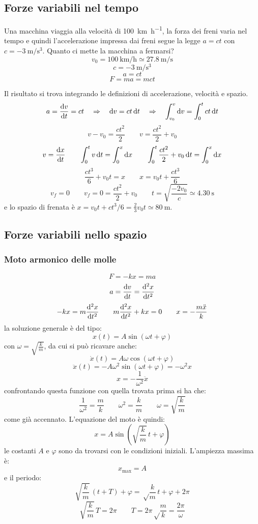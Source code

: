 \subsection{Forze variabili nel tempo}
\begin{Es}
  Una macchina viaggia alla velocità di \SI{100}{\kilo\meter\per\hour}, la forza dei freni
  varia nel tempo e quindi l'accelerazione impressa dai freni segue
  la legge $a=ct$ con $c=\SI{-3}{\meter\per\second^3}$. Quanto ci mette la
  macchina a fermarsi?
  \[ v_0=\SI{100}{\kilo\meter\per\hour} \simeq \SI{27.8}{\meter\per\second} \]
  \[ c=\SI{-3}{\meter\per\second^3} \]
  \[ a=ct \]
  \[ F=ma=mct \]

  Il risultato si trova integrando le definizioni di accelerazione, velocità e spazio.
  \[a=\frac{\mathrm{d} v}{\mathrm{d} t}=ct \quad \Rightarrow \quad\mathrm{d} v=ct\,\mathrm{d}
    t\quad\Rightarrow\quad\int_{v_0}^v\mathrm{d} v=\int_0^t ct\,\mathrm{d} t\]
  \[v-v_0=\frac{ct^2}{2}\qquad v=\frac{ct^2}{2}+v_0\]
  \[v=\frac{\mathrm{d} x}{\mathrm{d} t}\qquad\int_0^t v\,\mathrm{d} t=\int_0^x\mathrm{d}
    x\qquad\int_0^t\frac{ct^2}{2}+v_0\,\mathrm{d} t=\int_0^x\mathrm{d} x\]
  \[\frac{ct^3}{6}+v_0t=x\qquad x=v_0t+\frac{ct^3}{6}\]
  \[v_f=0\qquad v_f=0=\frac{ct^2}{2}+v_0\qquad
    t=\sqrt{\frac{-2v_0}{c}}\simeq \SI{4.30}{\second}\]
  e lo spazio di frenata è $x=v_0t+ct^3/6=\frac{2}{3}v_0t\simeq\SI{80}{\meter}$.
\end{Es}

\subsection{Forze variabili nello spazio}
\subsubsection{Moto armonico delle molle}
\label{armonico}

\begin{equation}F=-kx=ma\end{equation}
\[a=\frac{\mathrm{d} v}{\mathrm{d} t}=\frac{\mathrm{d}^2 x}{\mathrm{d} t^2}\]
\[-kx=m\frac{\mathrm{d}^2 x}{\mathrm{d} t^2}\qquad m\frac{\mathrm{d}^2 x}{\mathrm{d}
    t^2}+kx=0\qquad x=-\frac{m\ddot x}{k}\]
la soluzione generale è del tipo:
\begin{equation}x(t)=A\sin(\omega t+\varphi)\end{equation}
con $\omega=\sqrt{\frac{k}{m}}$, da cui si può ricavare anche:
\[\dot x(t)=A\omega\cos(\omega t+\varphi)\]
\[\ddot x(t)=-A\omega^2\sin(\omega t+\varphi)=-\omega^2x\]
\[x=-\frac{1}{\omega^2}\ddot x\]
confrontando questa funzione con quella trovata prima si ha che:
\[\frac{1}{\omega^2}=\frac{m}{k}\qquad \omega^2=\frac{k}{m}\qquad
  \omega=\sqrt{\frac{k}{m}}\]
come già accennato. L'equazione del moto è quindi:
\begin{equation}
  x=A\sin\left(\sqrt{\frac{k}{m}}\,t+\varphi\right)
\end{equation}
le costanti $A$ e $\varphi$ sono da trovarsi con le condizioni iniziali. L'ampiezza massima è:
\[x_{\text{max}}=A\]
e il periodo:
\[\sqrt{\frac{k}{m}}\,(t+T)+\varphi=\sqrt\frac{k}{m}\,t+\varphi+2\pi\]
\[\sqrt{\frac{k}{m}}\,T=2\pi\qquad
  T=2\pi\sqrt\frac{m}{k}=\frac{2\pi}{\omega}\]
